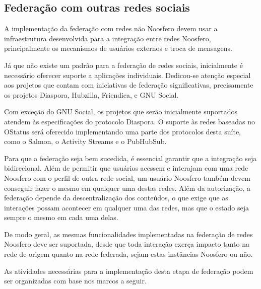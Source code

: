 \subsection{Federação com outras redes sociais}

A implementação da federação com redes não Noosfero devem usar a infraestrutura
desenvolvida para a integração entre redes Noosfero, principalmente os mecanismos
de usuários externos e troca de mensagens.

Já que não existe um padrão para a federação de redes sociais, inicialmente é
necessário oferecer suporte a aplicações individuais. Dedicou-se atenção especial
aos projetos que contam com iniciativas de federação significativas, precisamente
os projetos Diaspora, Hubzilla, Friendica, e GNU Social.

Com exceção do GNU Social, os projetos que serão inicialmente suportados atendem às
especificações do protocolo Diaspora. O suporte às redes baseadas no OStatus será
oferecido implementando uma parte dos protocolos desta suíte, como o Salmon, o
Activity Streams e o PubHubSub.

Para que a federação seja bem sucedida, é essencial garantir que a integração seja
bidirecional. Além de permitir que usuários acessem e interajam com uma rede
Noosfero com o perfil de outra rede social, um usuário Noosfero também devem
conseguir fazer o mesmo em qualquer uma destas redes. Além da autorização, a
federação depende da descentralização dos conteúdos, o que exige que as interações
possam acontecer em qualquer uma das redes, mas que o estado seja sempre o mesmo
em cada uma delas.

De modo geral, as mesmas funcionalidades implementadas na federação de redes
Noosfero deve ser suportada, desde que toda interação exerça impacto tanto na rede
de origem quanto na rede federada, sejam estas instâncias Noosfero ou não.

As atividades necessárias para a implementação desta etapa de federação podem ser
organizadas com base nos marcos a seguir.


